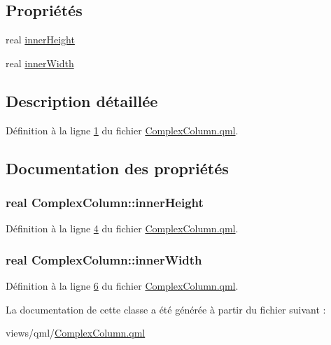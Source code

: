 \subsection*{Propriétés}
\begin{DoxyCompactItemize}
\item 
real \hyperlink{classComplexColumn_a8ed7398e27678a9b93bb33f37d6b3836}{inner\-Height}
\item 
real \hyperlink{classComplexColumn_a76206dc1264db4c7af6ed5b7a87a58aa}{inner\-Width}
\end{DoxyCompactItemize}


\subsection{Description détaillée}


Définition à la ligne \hyperlink{ComplexColumn_8qml_source_l00001}{1} du fichier \hyperlink{ComplexColumn_8qml_source}{Complex\-Column.\-qml}.



\subsection{Documentation des propriétés}
\hypertarget{classComplexColumn_a8ed7398e27678a9b93bb33f37d6b3836}{
\subsubsection[{inner\-Height}]{\setlength{\rightskip}{0pt plus 5cm}real Complex\-Column\-::inner\-Height}}\label{classComplexColumn_a8ed7398e27678a9b93bb33f37d6b3836}


Définition à la ligne \hyperlink{ComplexColumn_8qml_source_l00004}{4} du fichier \hyperlink{ComplexColumn_8qml_source}{Complex\-Column.\-qml}.

\hypertarget{classComplexColumn_a76206dc1264db4c7af6ed5b7a87a58aa}{
\subsubsection[{inner\-Width}]{\setlength{\rightskip}{0pt plus 5cm}real Complex\-Column\-::inner\-Width}}\label{classComplexColumn_a76206dc1264db4c7af6ed5b7a87a58aa}


Définition à la ligne \hyperlink{ComplexColumn_8qml_source_l00006}{6} du fichier \hyperlink{ComplexColumn_8qml_source}{Complex\-Column.\-qml}.



La documentation de cette classe a été générée à partir du fichier suivant \-:\begin{DoxyCompactItemize}
\item 
views/qml/\hyperlink{ComplexColumn_8qml}{Complex\-Column.\-qml}\end{DoxyCompactItemize}
